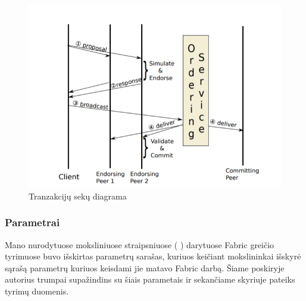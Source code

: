 \documentclass{VUMIFPSkursinis}
\begin{document}
\begin{figure}[H]
    \centering
    \includegraphics[scale=0.5]{img/MLP}
    \caption{Tranzakcijų sekų diagrama}   %
    \label{img:mlp}
\end{figure}



				
		\subsubsection{Parametrai}

		Mano nurodytuose moksliniuose straipsniuose (\cite{ThailandPerf} \cite{IMBResearch}) darytuose Fabric greičio tyrimuose
		buvo išskirtas parametrų sarašas, kuriuos keičiant mokslininkai išskyrė sąrašą parametrų kuriuos keisdami jie matavo Fabric darbą. 
		Šiame poskiryje autorius trumpai supažindins su šiais parametais ir sekančiame skyriuje pateiks tyrimų duomenis.
			
\end{document}
